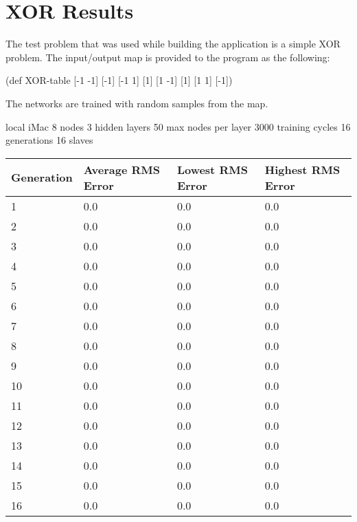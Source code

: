 \chapter[XOR Results]{XOR Results}
The test problem that was used while building the application is a simple XOR problem. The input/output map is provided to the program as the following: 

(def XOR-table {[-1 -1] [-1]
                [-1 1] [1]
                [1 -1] [1]
                [1 1] [-1]})

The networks are trained with random samples from the map.

local iMac
8 nodes
3 hidden layers
50 max nodes per layer
3000 training cycles
16 generations
16 slaves

\begin{center}
    \begin{tabular}{ | l | l | l | l |}
    \hline
    Generation & Average RMS Error & Lowest RMS Error & Highest RMS Error \\ \hline
    1 & 0.0 & 0.0 & 0.0 \\ \hline
    2 & 0.0 & 0.0 & 0.0 \\ \hline
    3 & 0.0 & 0.0 & 0.0 \\ \hline
    4 & 0.0 & 0.0 & 0.0 \\ \hline
    5 & 0.0 & 0.0 & 0.0 \\ \hline
    6 & 0.0 & 0.0 & 0.0 \\ \hline
    7 & 0.0 & 0.0 & 0.0 \\ \hline
    8 & 0.0 & 0.0 & 0.0 \\ \hline
    9 & 0.0 & 0.0 & 0.0 \\ \hline
    10 & 0.0 & 0.0 & 0.0 \\ \hline
    11 & 0.0 & 0.0 & 0.0 \\ \hline
    12 & 0.0 & 0.0 & 0.0 \\ \hline
    13 & 0.0 & 0.0 & 0.0 \\ \hline
    14 & 0.0 & 0.0 & 0.0 \\ \hline
    15 & 0.0 & 0.0 & 0.0 \\ \hline
    16 & 0.0 & 0.0 & 0.0 \\ \hline
    \end{tabular}
\end{center}



